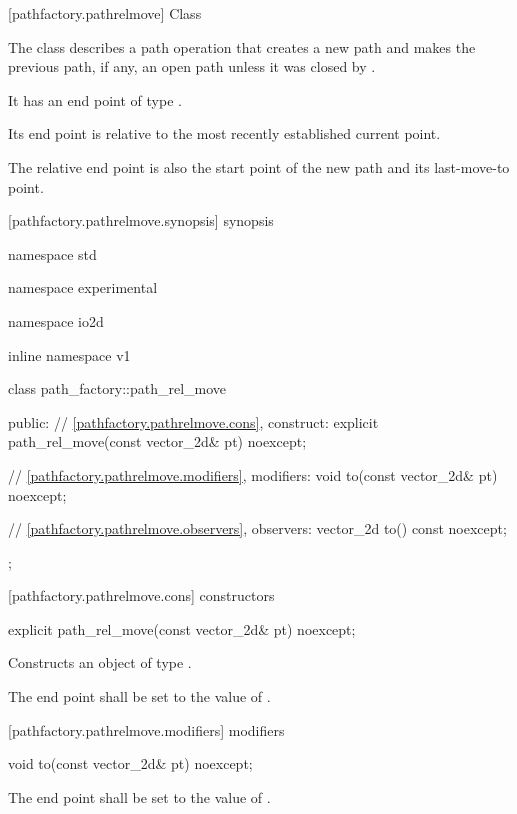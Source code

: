  [pathfactory.pathrelmove] {Class }

\pnum
{}
The class  describes a path operation that creates a new path and makes the previous path, if any, an open path unless it was closed by .

\pnum
It has an end point of type .

\pnum
Its end point is relative to the most recently established current point.

\pnum
The relative end point is also the start point of the new path and its last-move-to point.

 [pathfactory.pathrelmove.synopsis] { synopsis}

\begin{codeblock}
namespace std { namespace experimental { namespace io2d { inline namespace v1 {
  class path_factory::path_rel_move {
  public:
    // \ref{pathfactory.pathrelmove.cons}, construct:
    explicit path_rel_move(const vector_2d& pt) noexcept;

    // \ref{pathfactory.pathrelmove.modifiers}, modifiers:
    void to(const vector_2d& pt) noexcept;

    // \ref{pathfactory.pathrelmove.observers}, observers:
    vector_2d to() const noexcept;
  };
} } } }
\end{codeblock}

 [pathfactory.pathrelmove.cons] { constructors}

\begin{itemdecl}
    explicit path_rel_move(const vector_2d& pt) noexcept;
\end{itemdecl}
\begin{itemdescr}
	\pnum
	\effects
	Constructs an object of type .
	
	\pnum
	The end point shall be set to the value of .
\end{itemdescr}

 [pathfactory.pathrelmove.modifiers]{ modifiers}

\begin{itemdecl}
    void to(const vector_2d& pt) noexcept;
\end{itemdecl}
\begin{itemdescr}
	\pnum
	\effects
	The end point shall be set to the value of .
\end{itemdescr}

